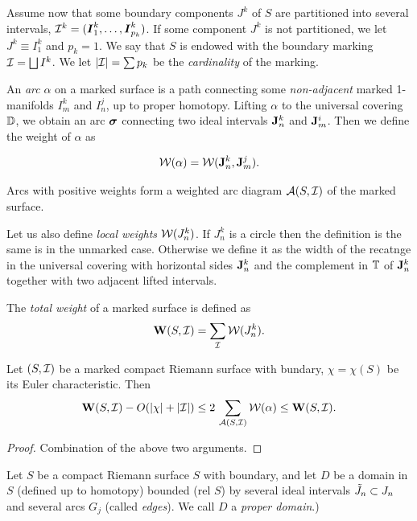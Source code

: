 Assume now that some boundary components $J^k$ of $S$ are   
partitioned into several intervals, 
${\mathcal I}^k= ({\boldsymbol{I}}_1^k, \dots, {\boldsymbol{I}}_{p_k}^k)$.
If some component $J^k$ is not
partitioned, we let $J^k\equiv I^k_1$  and  $p_k=1$.
We say that $S$ is endowed with  the boundary marking ${\mathcal I}=\bigsqcup I^k$.
We let $|{\mathcal I}| = \sum p_k$ be the {\it cardinality} of the marking.  
 
An {\it arc} $\alpha $ on a marked surface is a path connecting some
{\it non-adjacent }  marked 1-manifolds $I^k_m$ and $I^j_n$, %
up to proper homotopy.  Lifting $\alpha $ to the universal covering ${\Bbb D}$,
we obtain an arc ${\boldsymbol{\sigma}}$ connecting two ideal intervals ${\mathbf{J}}^k_n$ and
${\mathbf{J}}^i_m$.
Then we define the weight of $\alpha$ as

$$
   {\mathcal W}(\alpha)= {\mathcal W} ({\mathbf{J}}^k_n, {\mathbf{J}}^j_m). 
$$

Arcs with positive weights form a weighted arc diagram ${\mathcal A}(S, {\mathcal I})$
of the marked surface.


Let us also define {\it local weights} ${\mathcal W}( J^k_n)$.
If $J^k_n$ is a circle then the definition is the same is in the
unmarked case. Otherwise we define it as the width of the recatnge in
the universal covering with horizontal sides ${\mathbf{J}}^k_n$ and the
complement in ${\Bbb T}$ of ${\mathbf{J}}^k_n$ together with two adjacent lifted intervals. 

The {\it total weight} of a marked surface is defined as
$$
   {\mathbf{W}}(S, {\mathcal I}) = \sum_{\mathcal I} {\mathcal W}( J^k_n ).
$$ 



\begin{thm}\label{thin-thick for marked surfaces}
    Let $(S, {\mathcal I})$ be a marked  compact Riemann surface with bundary,
$\chi=\chi(S)$ be its Euler characteristic. Then
$$
  {\mathbf{W}}(S, {\mathcal I}) - O( | \chi |  + |{\mathcal I}|) \leq 2\, \sum_{{\mathcal A}(S, {\mathcal I}) } {\mathcal W}(\alpha ) \leq
  {\mathbf{W}}(S, {\mathcal I}).
$$   
\end{thm}


\begin{proof}
  Combination of the above two arguments. 
\end{proof}

Let $S$ be  a compact Riemann surface $S$ with  boundary, and 
let $D$ be a   %
domain in $S$ (defined up to homotopy) bounded (rel $S$) by several
ideal intervals  $\tilde J_n\subset  J_n $ and several arcs $G_j$ (called {\it edges}).
 We  call $D$ a {\it proper domain}.)
 
